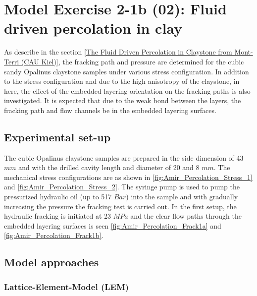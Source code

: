 \section{Model Exercise 2-1b (02): Fluid driven percolation in clay}
\label{sec:mex2-1b}
As describe in the section \ref{The Fluid Driven Percolation in Claystone from Mont-Terri (CAU Kiel)}, the fracking path and pressure are determined for the cubic sandy Opalinus claystone samples under various stress configuration. In addition to the stress configuration and due to the high anisotropy of the claystone, in here, the effect of the embedded layering orientation on the fracking paths is also investigated. It is expected that due to the weak bond between the layers, the fracking path and flow channels be in the embedded layering surfaces. 
\subsection{Experimental set-up}
The cubic Opalinus claystone samples are prepared in the side dimension of 43 $mm$ and with the drilled cavity length and diameter of 20 and 8 $mm$. The mechanical stress configurations are as shown in \ref{fig:Amir_Percolation_Stress_1} and \ref{fig:Amir_Percolation_Stress_2}. The syringe pump is used to pump the pressurized hydraulic oil (up to 517 $Bar$) into the sample and with gradually increasing the pressure the fracking test is carried out. In the first setup, the hydraulic fracking is initiated at 23 $MPa$ and the clear flow paths through the embedded layering surfaces is seen \ref{fig:Amir_Percolation_Frack1a} and \ref{fig:Amir_Percolation_Frack1b}. 

\subsection{Model approaches}
\subsubsection*{Lattice-Element-Model (LEM)}

